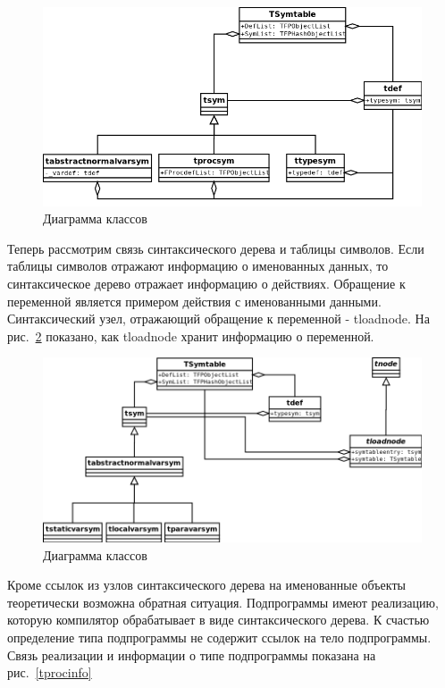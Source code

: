 \documentclass{imcs}
\begin{document}
\begin{figure}[htb]
\centering
\includegraphics[width=\textwidth]{./uml/sym-def-sym-inheritence.png}
\caption{Диаграмма классов}
\label{sym-def-sym-inheritence}
\end{figure}

Теперь рассмотрим связь синтаксического дерева и таблицы символов. Если таблицы символов отражают
информацию о именованных данных, то синтаксическое дерево отражает информацию о действиях. 
Обращение к переменной является примером действия с именованными данными. Синтаксический
узел, отражающий обращение к переменной - tloadnode. На рис.~\ref{sym-node} показано, как tloadnode
хранит информацию о переменной.

\begin{figure}[htb]
\centering
\includegraphics[width=\textwidth]{./uml/sym-node.png}
\caption{Диаграмма классов}
\label{sym-node}
\end{figure}

Кроме ссылок из узлов синтаксического дерева на именованные объекты теоретически возможна обратная
ситуация. Подпрограммы имеют реализацию, которую компилятор обрабатывает в виде синтаксического
дерева. К счастью определение типа подпрограммы не содержит ссылок на тело подпрограммы. Связь
реализации и информации о типе подпрограммы показана на рис.~\ref{tprocinfo}
\end{document}
